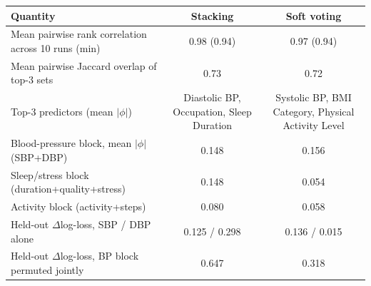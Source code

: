 \begin{tabular}{@{}lcc@{}}
\toprule
Quantity & Stacking & Soft voting\\
\midrule
Mean pairwise rank correlation across 10 runs (min) & 0.98 (0.94) & 0.97 (0.94)\\
Mean pairwise Jaccard overlap of top-3 sets & 0.73 & 0.72\\
Top-3 predictors (mean $|\phi|$) & Diastolic BP, Occupation, Sleep Duration & Systolic BP, BMI Category, Physical Activity Level\\
Blood-pressure block, mean $|\phi|$ (SBP+DBP) & 0.148 & 0.156\\
Sleep/stress block (duration+quality+stress) & 0.148 & 0.054\\
Activity block (activity+steps) & 0.080 & 0.058\\
Held-out $\Delta$log-loss, SBP / DBP alone & 0.125 / 0.298 & 0.136 / 0.015\\
Held-out $\Delta$log-loss, BP block permuted jointly & 0.647 & 0.318\\
\bottomrule
\end{tabular}